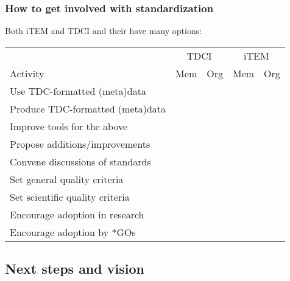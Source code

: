 \documentclass[12pt,aspectratio=169]{beamer}
\newcommand\checkcell{\cellcolor{tdcyellow0} \checkmark}
\begin{document}
\begin{frame}
\frametitle{How to get involved with standardization}

Both iTEM and TDCI  and their  have many options:

\smallskip
\begin{tabular}{l|cc|cc}
 & \multicolumn{2}{c|}{TDCI} & \multicolumn{2}{c}{iTEM} \\
Activity & Mem & Org & Mem & Org \\
\hline
Use TDC-formatted (meta)data      & \checkcell &            & \checkcell &            \\
Produce TDC-formatted (meta)data  & \checkcell & \checkcell & \checkcell & \checkcell \\
Improve tools for the above       & \checkcell & \checkcell & \checkcell & \checkcell \\
\hline
Propose additions/improvements    & \checkcell &            & \checkcell &            \\
Convene discussions of standards  &            & \checkcell &            & \checkcell \\
\hline
Set general quality criteria      & \checkcell &            & \checkcell &            \\
Set scientific quality criteria   &            &            & \checkcell &            \\
\hline
Encourage adoption in research    &            &            & \checkcell & \checkcell \\
Encourage adoption by *GOs        &            & \checkcell &            &            \\
\hline
\end{tabular}

\end{frame}

\subsection{Next steps and vision}
\end{document}
